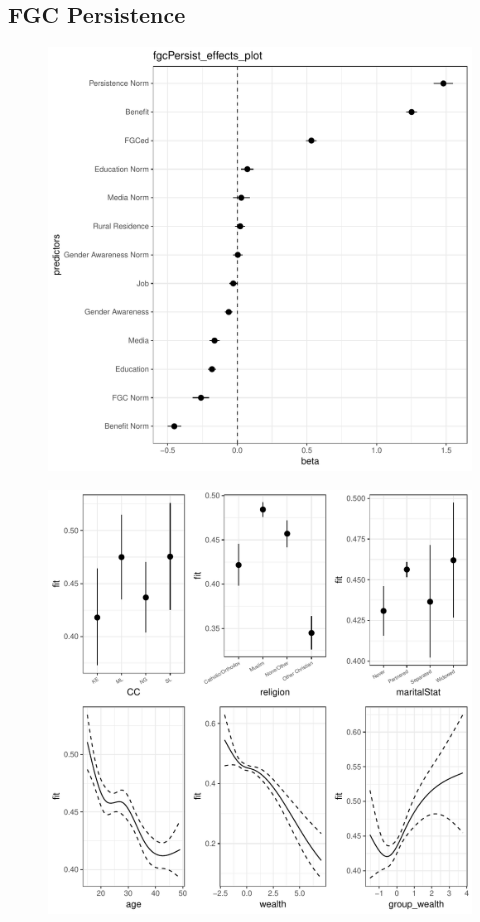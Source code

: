 \documentclass[12pt,]{article}
\begin{document}
\newpage

\subsection{FGC Persistence}
\begin{center}
\begin{figure}[h!]
\includegraphics[scale=0.7]{./git_push/fgcPersist_effects_plot.Rout.pdf}
\end{figure}
\end{center}

\begin{center}
\begin{figure}[h!]
\includegraphics[scale=0.7]{./git_push/fgcPersist_isoplots.Rout.pdf}
\end{figure}
\end{center}
\end{document}
